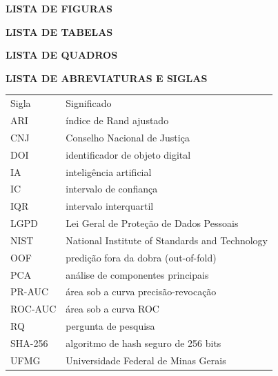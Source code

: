 \documentclass[12pt,oneside,a4paper,openany,brazil]{abntex2}
\makeatletter
\newcommand{\frontheading}[1]{\par\noindent\textbf{#1}\par\vspace{3pt}}
\newcommand{\listadequadrosinterno}{\@starttoc{loq}}
\newcommand{\listadefigurainterno}{\@starttoc{lof}}
\newcommand{\listadetabelainterno}{\@starttoc{lot}}
\makeatother
\begin{document}
\begingroup\SingleSpacing\setlength{\parindent}{0pt}\fontsize{10.5}{12}\selectfont
\frontheading{LISTA DE FIGURAS}
\listadefigurainterno
\vspace{5pt}\frontheading{LISTA DE TABELAS}
\listadetabelainterno
\vspace{5pt}\frontheading{LISTA DE QUADROS}
\listadequadrosinterno
\vspace{5pt}\frontheading{LISTA DE ABREVIATURAS E SIGLAS}
\begin{tabular}{@{}p{2.2cm}p{12.5cm}@{}}
Sigla & Significado\\
ARI & índice de Rand ajustado\\
CNJ & Conselho Nacional de Justiça\\
DOI & identificador de objeto digital\\
IA & inteligência artificial\\
IC & intervalo de confiança\\
IQR & intervalo interquartil\\
LGPD & Lei Geral de Proteção de Dados Pessoais\\
NIST & National Institute of Standards and Technology\\
OOF & predição fora da dobra (out-of-fold)\\
PCA & análise de componentes principais\\
PR-AUC & área sob a curva precisão-revocação\\
ROC-AUC & área sob a curva ROC\\
RQ & pergunta de pesquisa\\
SHA-256 & algoritmo de hash seguro de 256 bits\\
UFMG & Universidade Federal de Minas Gerais\\
\end{tabular}
\endgroup
\clearpage

\begingroup\SingleSpacing\fontsize{10.5}{12}\selectfont
\tableofcontents*
\endgroup
\clearpage

\textual
\setcounter{page}{1}
\pagestyle{abntbody}

\end{document}
